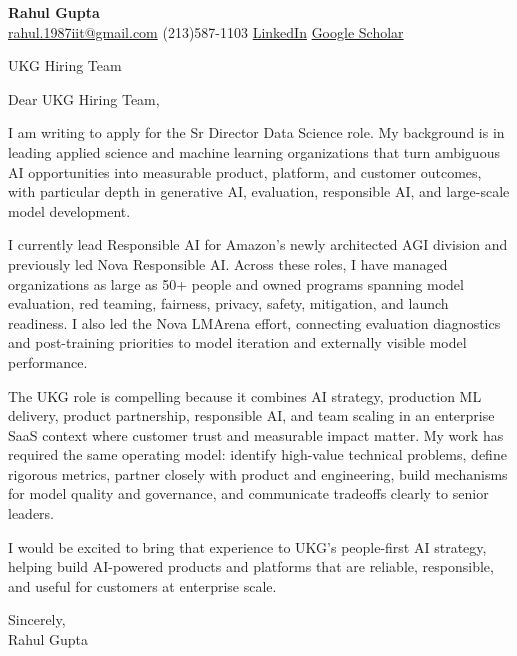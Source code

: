 \documentclass[11pt]{article}
\begin{document}
{\Large\bfseries Rahul Gupta}\\[2pt]
\href{mailto:rahul.1987iit@gmail.com}{rahul.1987iit@gmail.com} \quad
(213)587-1103 \quad
\href{https://www.linkedin.com/in/rahul-gupta-16139818}{LinkedIn} \quad
\href{https://scholar.google.com/citations?user=gSTLsFcAAAAJ}{Google Scholar}

\vspace{18pt}

UKG Hiring Team

\vspace{8pt}

Dear UKG Hiring Team,

I am writing to apply for the Sr Director Data Science role. My background is in leading applied science and machine learning organizations that turn ambiguous AI opportunities into measurable product, platform, and customer outcomes, with particular depth in generative AI, evaluation, responsible AI, and large-scale model development.

I currently lead Responsible AI for Amazon's newly architected AGI division and previously led Nova Responsible AI. Across these roles, I have managed organizations as large as 50+ people and owned programs spanning model evaluation, red teaming, fairness, privacy, safety, mitigation, and launch readiness. I also led the Nova LMArena effort, connecting evaluation diagnostics and post-training priorities to model iteration and externally visible model performance.

The UKG role is compelling because it combines AI strategy, production ML delivery, product partnership, responsible AI, and team scaling in an enterprise SaaS context where customer trust and measurable impact matter. My work has required the same operating model: identify high-value technical problems, define rigorous metrics, partner closely with product and engineering, build mechanisms for model quality and governance, and communicate tradeoffs clearly to senior leaders.

I would be excited to bring that experience to UKG's people-first AI strategy, helping build AI-powered products and platforms that are reliable, responsible, and useful for customers at enterprise scale.

Sincerely,\\[18pt]
Rahul Gupta
\end{document}
